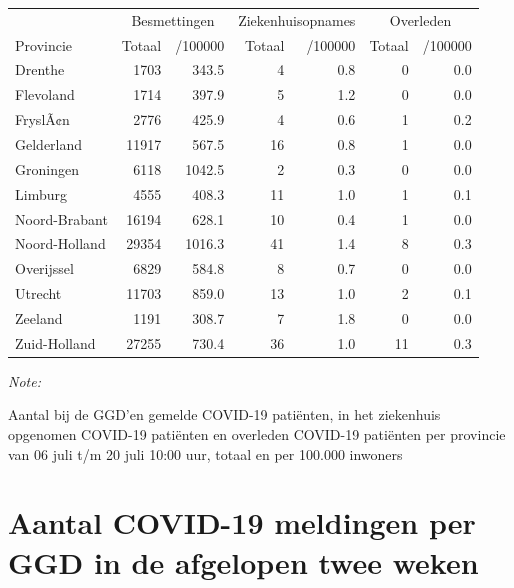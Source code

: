 \documentclass[
  english,
  man,floatsintext]{apa6}
\begin{document}
\begin{table}
\centering
\begin{threeparttable}
\begin{tabular}{lrrrrrr}
\toprule
\multicolumn{1}{c}{ } & \multicolumn{2}{c}{Besmettingen} & \multicolumn{2}{c}{Ziekenhuisopnames} & \multicolumn{2}{c}{Overleden} \\
\cmidrule(l{3pt}r{3pt}){2-3} \cmidrule(l{3pt}r{3pt}){4-5} \cmidrule(l{3pt}r{3pt}){6-7}
Provincie & Totaal & /100000 & Totaal & /100000 & Totaal & /100000\\
\midrule
Drenthe & 1703 & 343.5 & 4 & 0.8 & 0 & 0.0\\
Flevoland & 1714 & 397.9 & 5 & 1.2 & 0 & 0.0\\
FryslÃ¢n & 2776 & 425.9 & 4 & 0.6 & 1 & 0.2\\
Gelderland & 11917 & 567.5 & 16 & 0.8 & 1 & 0.0\\
Groningen & 6118 & 1042.5 & 2 & 0.3 & 0 & 0.0\\
Limburg & 4555 & 408.3 & 11 & 1.0 & 1 & 0.1\\
Noord-Brabant & 16194 & 628.1 & 10 & 0.4 & 1 & 0.0\\
Noord-Holland & 29354 & 1016.3 & 41 & 1.4 & 8 & 0.3\\
Overijssel & 6829 & 584.8 & 8 & 0.7 & 0 & 0.0\\
Utrecht & 11703 & 859.0 & 13 & 1.0 & 2 & 0.1\\
Zeeland & 1191 & 308.7 & 7 & 1.8 & 0 & 0.0\\
Zuid-Holland & 27255 & 730.4 & 36 & 1.0 & 11 & 0.3\\
\bottomrule
\end{tabular}
\begin{tablenotes}
\item \textit{Note: } 
\item Aantal bij de GGD’en gemelde COVID-19 patiënten, in het ziekenhuis opgenomen COVID-19 patiënten en overleden COVID-19 patiënten per provincie van 06 juli t/m 20 juli 10:00 uur, totaal en per 100.000 inwoners
\end{tablenotes}
\end{threeparttable}
\end{table}

\newpage

\hypertarget{aantal-covid-19-meldingen-per-ggd-in-de-afgelopen-twee-weken}{%
\section{Aantal COVID-19 meldingen per GGD in de afgelopen twee weken}\label{aantal-covid-19-meldingen-per-ggd-in-de-afgelopen-twee-weken}}
\end{document}
